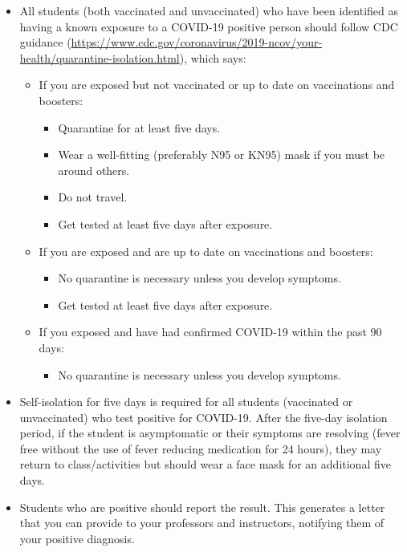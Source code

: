 \documentclass[12pt, notitlepage]{article}   	%
\begin{document}
{\begin{itemize}
{	contacts, and contact information for their preferred healthcare provider.}
	\item{All students (both vaccinated and unvaccinated) who have been identified as 
	having a known exposure to a COVID-19 positive person should follow CDC guidance 
	(\url{https://www.cdc.gov/coronavirus/2019-ncov/your-health/quarantine-isolation.html}), 
	which says:
		\begin{itemize}
			\item{If you are exposed but not vaccinated or up to date on vaccinations and boosters:
				\begin{itemize}
					\item{Quarantine for at least five days.}
					\item{Wear a well-fitting (preferably N95 or KN95) mask if you must be around others.}
					\item{Do not travel.}
					\item{Get tested at least five days after exposure.}
				\end{itemize}
			}
			\item{If you are exposed and are up to date on vaccinations and boosters:
				\begin{itemize}
					\item{No quarantine is necessary unless you develop symptoms.}
					\item{Get tested at least five days after exposure.}
				\end{itemize}
			}
			\item{If you exposed and have had confirmed COVID-19 within the past 90 days:
				\begin{itemize}
					\item{No quarantine is necessary unless you develop symptoms.}
				\end{itemize}
			}
		\end{itemize}
	}
	\item{Self-isolation for five days is required for all students 
			(vaccinated or unvaccinated) who test positive for COVID-19. 
			After the five-day isolation period, if the student is asymptomatic or 
			their symptoms are resolving (fever free without the use of fever reducing 
			medication for 24 hours), they may return to class/activities but should 
			wear a face mask for an additional five days.}
	\item{Students who are positive should report the result. 
			This generates a letter that you can provide to your professors and 
			instructors, notifying them of your positive diagnosis.}
\end{itemize}

}
\end{document}
